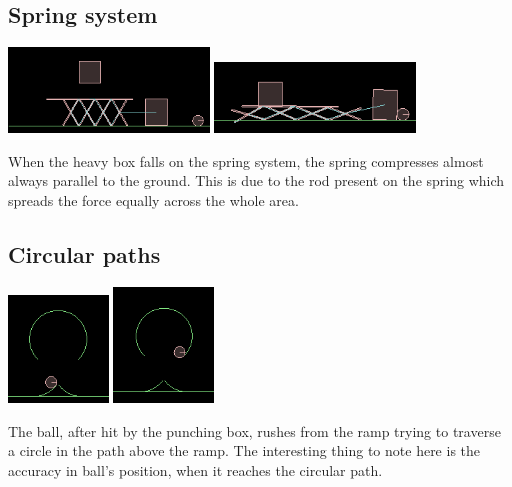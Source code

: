 \documentclass[11pt]{article}
\begin{document}
\subsection{Spring system}
\begin{center}
\includegraphics[width=0.4\textwidth,height=0.1\textheight]{img/spring1} 
\hspace{3em}
\includegraphics[width=0.4\textwidth,height=0.1\textheight]{img/spring2}
\end{center}
When the heavy box falls on the spring system, the spring compresses almost always parallel to the ground. This is due to the rod present on the spring which spreads the force equally across the whole area.

\subsection{Circular paths}
\begin{center}
\includegraphics[width=0.2\textwidth,height=0.2\textheight]{img/circle1} 
\hspace{6em}
\includegraphics[width=0.2\textwidth,height=0.2\textheight]{img/circle2}
\end{center}
The ball, after hit by the punching box, rushes from the ramp trying to traverse a circle in the path above the ramp.
The interesting thing to note here is the accuracy in ball's position, when it reaches the circular path.
\end{document}
